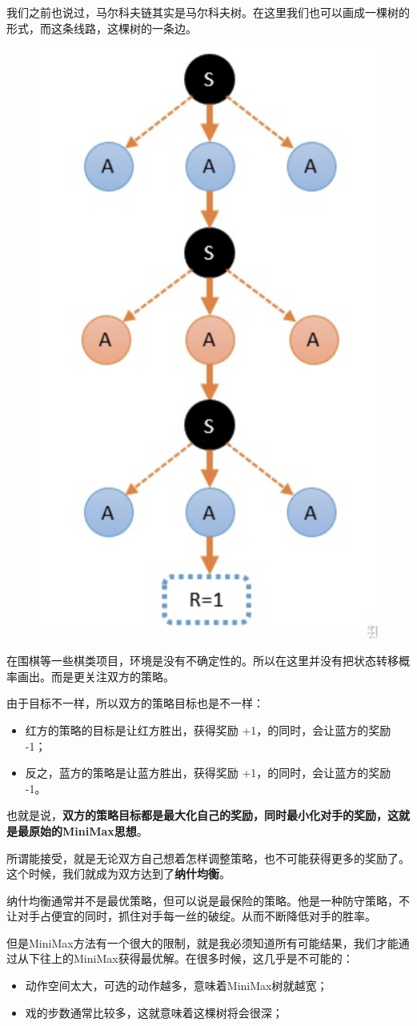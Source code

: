 \documentclass[12pt]{article}
\begin{document}
我们之前也说过，马尔科夫链其实是马尔科夫树。在这里我们也可以画成一棵树的形式，而这条线路，这棵树的一条边。
\begin{figure}[H]
    \centering
    \includegraphics[width=.3\textwidth]{fig/ReinforcementLearning/AlphaZero_Markov_Tree_Example.png}
\end{figure}

在围棋等一些棋类项目，环境是没有不确定性的。所以在这里并没有把状态转移概率画出。而是更关注双方的策略。

由于目标不一样，所以双方的策略目标也是不一样：
\begin{itemize}
\setlength{\itemsep}{0pt}
\setlength{\parsep}{0pt}
\setlength{\parskip}{0pt}
    \item 红方的策略的目标是让红方胜出，获得奖励 +1，的同时，会让蓝方的奖励 -1；
    \item 反之，蓝方的策略是让蓝方胜出，获得奖励 +1，的同时，会让蓝方的奖励 -1。
\end{itemize}

也就是说，\textbf{双方的策略目标都是最大化自己的奖励，同时最小化对手的奖励，这就是最原始的MiniMax思想}。

所谓能接受，就是无论双方自己想着怎样调整策略，也不可能获得更多的奖励了。这个时候，我们就成为双方达到了\textbf{纳什均衡}。

纳什均衡通常并不是最优策略，但可以说是最保险的策略。他是一种防守策略，不让对手占便宜的同时，抓住对手每一丝的破绽。从而不断降低对手的胜率。

但是MiniMax方法有一个很大的限制，就是我必须知道所有可能结果，我们才能通过从下往上的MiniMax获得最优解。在很多时候，这几乎是不可能的：
\begin{itemize}
\setlength{\itemsep}{0pt}
\setlength{\parsep}{0pt}
\setlength{\parskip}{0pt}
    \item 动作空间太大，可选的动作越多，意味着MiniMax树就越宽；
    \item 戏的步数通常比较多，这就意味着这棵树将会很深；
\end{itemize}
\end{document}
